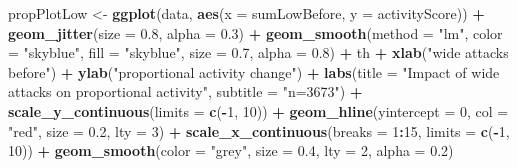 \documentclass[10pt,]{scrartcl}
\newenvironment{Shaded}{\begin{snugshade}}{\end{snugshade}}
\newcommand{\KeywordTok}[1]{\textcolor[rgb]{0.13,0.29,0.53}{\textbf{#1}}}
\newcommand{\DataTypeTok}[1]{\textcolor[rgb]{0.13,0.29,0.53}{#1}}
\newcommand{\DecValTok}[1]{\textcolor[rgb]{0.00,0.00,0.81}{#1}}
\newcommand{\FloatTok}[1]{\textcolor[rgb]{0.00,0.00,0.81}{#1}}
\newcommand{\StringTok}[1]{\textcolor[rgb]{0.31,0.60,0.02}{#1}}
\newcommand{\OperatorTok}[1]{\textcolor[rgb]{0.81,0.36,0.00}{\textbf{#1}}}
\newcommand{\NormalTok}[1]{#1}
\begin{document}
\begin{Shaded}
\begin{Highlighting}[]
\NormalTok{propPlotLow <-}\StringTok{ }\KeywordTok{ggplot}\NormalTok{(data, }\KeywordTok{aes}\NormalTok{(}\DataTypeTok{x =}\NormalTok{ sumLowBefore, }\DataTypeTok{y =}\NormalTok{ activityScore)) }\OperatorTok{+}
\StringTok{    }\KeywordTok{geom_jitter}\NormalTok{(}\DataTypeTok{size =} \FloatTok{0.8}\NormalTok{, }\DataTypeTok{alpha =} \FloatTok{0.3}\NormalTok{) }\OperatorTok{+}\StringTok{ }\KeywordTok{geom_smooth}\NormalTok{(}\DataTypeTok{method =} \StringTok{"lm"}\NormalTok{,}
    \DataTypeTok{color =} \StringTok{"skyblue"}\NormalTok{, }\DataTypeTok{fill =} \StringTok{"skyblue"}\NormalTok{, }\DataTypeTok{size =} \FloatTok{0.7}\NormalTok{, }\DataTypeTok{alpha =} \FloatTok{0.8}\NormalTok{) }\OperatorTok{+}
\StringTok{    }\NormalTok{th }\OperatorTok{+}\StringTok{ }\KeywordTok{xlab}\NormalTok{(}\StringTok{"wide attacks before"}\NormalTok{) }\OperatorTok{+}\StringTok{ }\KeywordTok{ylab}\NormalTok{(}\StringTok{"proportional activity change"}\NormalTok{) }\OperatorTok{+}
\StringTok{    }\KeywordTok{labs}\NormalTok{(}\DataTypeTok{title =} \StringTok{"Impact of wide attacks on proportional activity"}\NormalTok{,}
        \DataTypeTok{subtitle =} \StringTok{"n=3673"}\NormalTok{) }\OperatorTok{+}\StringTok{ }\KeywordTok{scale_y_continuous}\NormalTok{(}\DataTypeTok{limits =} \KeywordTok{c}\NormalTok{(}\OperatorTok{-}\DecValTok{1}\NormalTok{,}
    \DecValTok{10}\NormalTok{)) }\OperatorTok{+}\StringTok{ }\KeywordTok{geom_hline}\NormalTok{(}\DataTypeTok{yintercept =} \DecValTok{0}\NormalTok{, }\DataTypeTok{col =} \StringTok{"red"}\NormalTok{, }\DataTypeTok{size =} \FloatTok{0.2}\NormalTok{,}
    \DataTypeTok{lty =} \DecValTok{3}\NormalTok{) }\OperatorTok{+}\StringTok{ }\KeywordTok{scale_x_continuous}\NormalTok{(}\DataTypeTok{breaks =} \DecValTok{1}\OperatorTok{:}\DecValTok{15}\NormalTok{, }\DataTypeTok{limits =} \KeywordTok{c}\NormalTok{(}\OperatorTok{-}\DecValTok{1}\NormalTok{,}
    \DecValTok{10}\NormalTok{)) }\OperatorTok{+}\StringTok{ }\KeywordTok{geom_smooth}\NormalTok{(}\DataTypeTok{color =} \StringTok{"grey"}\NormalTok{, }\DataTypeTok{size =} \FloatTok{0.4}\NormalTok{, }\DataTypeTok{lty =} \DecValTok{2}\NormalTok{, }\DataTypeTok{alpha =} \FloatTok{0.2}\NormalTok{)}



\end{Highlighting}
\end{Shaded}
\end{document}
